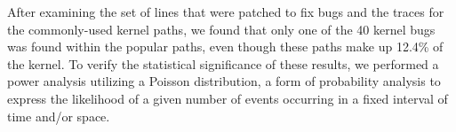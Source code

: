 %
%
After examining the set of lines that were patched to fix bugs and the traces for
the commonly-used kernel paths, we found that only one of the 40 kernel bugs
was found within the popular paths, even though these paths make up 12.4\% of the kernel.
To verify the statistical significance of these results, we performed a power
analysis utilizing a Poisson distribution, a form of probability analysis to express the
likelihood of a given number of events occurring in a fixed interval of time
and/or space.

